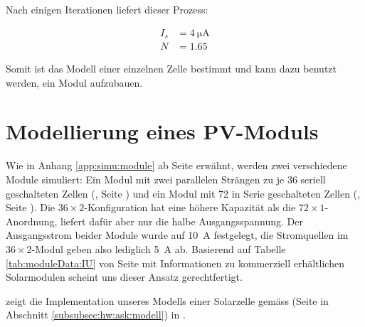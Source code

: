Nach einigen Iterationen liefert dieser Prozess\footnotemark:


\begin{align}
    \label{eq:cell:diode:IS:N:result}
    I_s &= \SI{4}{\micro\ampere} \\
    N   &= 1.65
\end{align}

Somit ist  das Modell  einer einzelnen  Zelle bestimmt  und kann  dazu benutzt
werden,  ein   Modul  aufzubauen.


\section{Modellierung eines PV-Moduls}
\label{sec:simu:model:module}


Wie  in   Anhang  \ref{app:simu:module}  ab   Seite  \pageref{app:simu:module}
erw\"ahnt,     werden     zwei      verschiedene     Module     simuliert: Ein
Modul    mit    zwei    parallelen     Str\"angen    zu    je    36    seriell
geschalteten    Zellen     (,    Seite
\pageref{fig:ltspice:module:cellBased:36x2})    und   ein    Modul   mit    72
in   Serie   geschalteten  Zellen   (,
Seite     \pageref{fig:ltspice:module:cellBased:72x1}). Die     $36     \times
2$-Konfiguration   hat   eine  h\"ohere   Kapazit\"at   als
die   $72  \times   1$-Anordnung,   liefert  daf\"ur   aber   nur  die   halbe
Ausgangsspannung. Der Ausgangsstrom  beider Module wurde  auf \SI{10}{\ampere}
festgelegt,  die Stromquellen  im  $36 \times  2$-Modul  geben also  lediglich
\SI{5}{\ampere}  ab. Basierend auf  Tabelle \ref{tab:moduleData:IU}  von Seite
\pageref{tab:moduleData:IU}  mit Informationen  zu kommerziell  erh\"altlichen
Solarmodulen scheint uns dieser Ansatz gerechtfertigt.

   zeigt   die  Implementation   unseres   Modells
einer     Solarzelle      gem\"ass          (Seite
\pageref{fig:circuit:solarCell} in Abschnitt \ref{subsubsec:hw:ask:modell}) in
.

